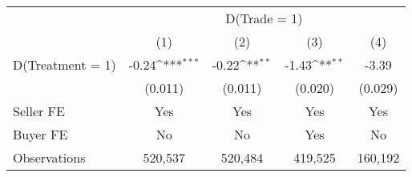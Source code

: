 \documentclass{article}
\newcommand{\sym}[1]{\ifmmode^{#1}\else\(^{#1}\)\fi}
\begin{document}
\begin{tabular}{l*{4}{c}}
\toprule

&
\multicolumn{4}{c}{D(Trade
=
1)}
\\
\cmidrule(lr){2-5}
                    &\multicolumn{1}{c}{(1)}         &\multicolumn{1}{c}{(2)}         &\multicolumn{1}{c}{(3)}         &\multicolumn{1}{c}{(4)}         \\
\midrule
D(Treatment = 1) &      -0.24\sym{***}&      -0.22\sym{**} &      -1.43\sym{**} &      -3.39         \\
                    &     (0.011)         &     (0.011)         &     (0.020)         &     (0.029)         \\\bottomrule
Seller FE&         Yes         &         Yes         &         Yes         &         Yes         \\
Buyer FE            &          No         &          No         &         Yes         &          No         \\

Observations        &     520,537         &     520,484         &     419,525         &     160,192         \\
\bottomrule \end{tabular}
\end{document}
